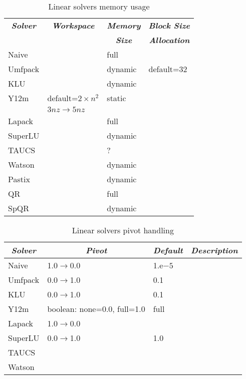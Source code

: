 \begin{table}
\centering
\caption{Linear solvers memory usage}\label{tab:linear-solvers-memory}
\begin{tabular}{llll}
\hline
	\multicolumn{1}{c}{\textbf{\emph{Solver}}} &
	\multicolumn{1}{c}{\textbf{\emph{Workspace}}} &
	\multicolumn{1}{c}{\textbf{\emph{Memory}}} &
	\multicolumn{1}{c}{\textbf{\emph{Block Size}}} \\
	&
	&
	\multicolumn{1}{c}{\textbf{\emph{Size}}} &
	\multicolumn{1}{c}{\textbf{\emph{Allocation}}} \\
\hline\hline
	Naive		& 			& full		&		\\
	Umfpack 	& 			& dynamic	& default=32	\\
	KLU 		& 			& dynamic	& 		\\
	Y12m 		& default=$2\times{n^2}$& static	&		\\
			& $3nz \rightarrow 5nz$	&		&		\\
	Lapack		&			& full		&		\\
	SuperLU		& 			& dynamic 	&		\\
	TAUCS		&			& ?		&		\\
	Watson		&			& dynamic	&		\\
	Pastix		&			& dynamic	&		\\
	QR		&			& full		&		\\
	SpQR		&			& dynamic	&		\\
\hline
\end{tabular}
\end{table}

\begin{table}
\centering
\caption{Linear solvers pivot handling}\label{tab:linear-solvers-pivot}
\begin{tabular}{llll}
\hline
	\multicolumn{1}{c}{\textbf{\emph{Solver}}} &
	\multicolumn{1}{c}{\textbf{\emph{Pivot}}} &
	\multicolumn{1}{c}{\textbf{\emph{Default}}} &
	\multicolumn{1}{c}{\textbf{\emph{Description}}} \\
\hline\hline
	Naive		& 1.0$\rightarrow$0.0		& 1.e$-5$	& \\
	Umfpack 	& 0.0$\rightarrow$1.0 		& 0.1 		& \\
	KLU 		& 0.0$\rightarrow$1.0 		& 0.1 		& \\
	Y12m 		& boolean: none=0.0, full=1.0	& full		& \\
	Lapack		& 1.0$\rightarrow$0.0		&		& \\
	SuperLU		& 0.0$\rightarrow$1.0		& 1.0		& \\
	TAUCS		&				&		& \\
	Watson		&				&		& \\
\hline
\end{tabular}
\end{table}



